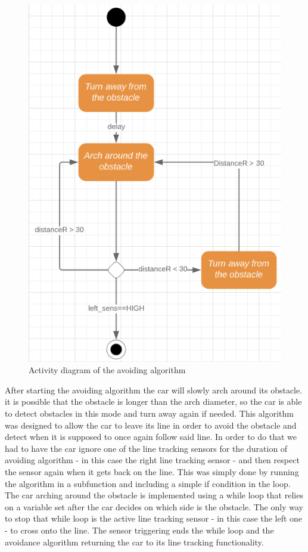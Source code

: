 \documentclass[conference]{IEEEtran}
\begin{document}
\begin{figure}[h!]
	\includegraphics[width=\linewidth]{AvoidActivityDiagram.png}
	\caption{Activity diagram of the avoiding algorithm}
	\label{fig:AAD}
\end{figure}
After starting the avoiding algorithm the car will slowly arch around its obstacle. it is possible that the obstacle is longer than the arch diameter, so the car is able to detect obstacles in this mode and turn away again if needed.
This algorithm was designed to allow the car to leave its line in order to avoid the obstacle and detect when it is supposed to once again follow said line. In order to do that we had to have the car ignore one of the line tracking sensors for the duration of avoiding algorithm - in this case the right line tracking sensor - and then respect the sensor again when it gets back on the line. This was simply done by running the algorithm in a subfunction and including a simple if condition in the loop. The car arching around the obstacle is implemented using a while loop that relies on a variable set after the car decides on which side is the obstacle. The only way to stop that while loop is the active line tracking sensor - in this case the left one - to cross onto the line. The sensor triggering ends the while loop and the avoidance algorithm returning the car to its line tracking functionality.
\end{document}
